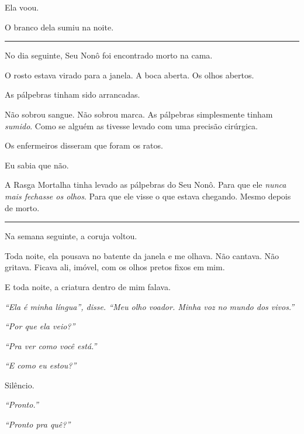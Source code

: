 \noindent Ela voou.

\noindent O branco dela sumiu na noite.

\vspace{0.5em}\noindent\rule{\textwidth}{0.5pt}\vspace{0.5em}

\noindent No dia seguinte, Seu Nonô foi encontrado morto na cama.

\noindent O rosto estava virado para a janela.
A boca aberta.
Os olhos abertos.

\noindent As pálpebras tinham sido arrancadas.

\noindent Não sobrou sangue. Não sobrou marca. As pálpebras simplesmente tinham \textit{sumido}. Como se alguém as tivesse levado com uma precisão cirúrgica.

\noindent Os enfermeiros disseram que foram os ratos.

\noindent Eu sabia que não.

\noindent A Rasga Mortalha tinha levado as pálpebras do Seu Nonô.
Para que ele \textit{nunca mais fechasse os olhos}.
Para que ele visse o que estava chegando.
Mesmo depois de morto.

\vspace{0.5em}\noindent\rule{\textwidth}{0.5pt}\vspace{0.5em}

\noindent Na semana seguinte, a coruja voltou.

\noindent Toda noite, ela pousava no batente da janela e me olhava. Não cantava. Não gritava. Ficava ali, imóvel, com os olhos pretos fixos em mim.

\noindent E toda noite, a criatura dentro de mim falava.

\noindent \textit{\textquotedblleft{}Ela é minha língua\textquotedblright{}\textit{, disse. }\textquotedblleft{}Meu olho voador. Minha voz no mundo dos vivos.\textquotedblright{}}

\noindent \textit{\textquotedblleft{}Por que ela veio?\textquotedblright{}}

\noindent \textit{\textquotedblleft{}Pra ver como você está.\textquotedblright{}}

\noindent \textit{\textquotedblleft{}E como eu estou?\textquotedblright{}}

\noindent Silêncio.

\noindent \textit{\textquotedblleft{}Pronto.\textquotedblright{}}

\noindent \textit{\textquotedblleft{}Pronto pra quê?\textquotedblright{}}

